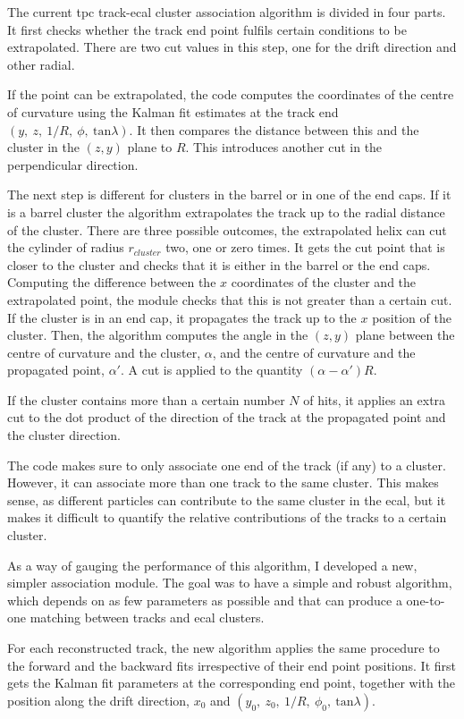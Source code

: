 The current \gls{tpc} track-\gls{ecal} cluster association algorithm is divided in four parts. It first checks whether the track end point fulfils certain conditions to be extrapolated. There are two cut values in this step, one for the drift direction and other radial.

If the point can be extrapolated, the code computes the coordinates of the centre of curvature using the Kalman fit estimates at the track end $(y, \ z, \ 1/R, \ \phi, \ \mathrm{tan}\lambda)$. It then compares the distance between this and the cluster in the $(z,y)$ plane to $R$. This introduces another cut in the perpendicular direction.

The next step is different for clusters in the barrel or in one of the end caps. If it is a barrel cluster the algorithm extrapolates the track up to the radial distance of the cluster. There are three possible outcomes, the extrapolated helix can cut the cylinder of radius $r_{cluster}$ two, one or zero times. It gets the cut point that is closer to the cluster and checks that it is either in the barrel or the end caps. Computing the difference between the $x$ coordinates of the cluster and the extrapolated point, the module checks that this is not greater than a certain cut. If the cluster is in an end cap, it propagates the track up to the $x$ position of the cluster. Then, the algorithm computes the angle in the $(z,y)$ plane between the centre of curvature and the cluster, $\alpha$, and the centre of curvature and the propagated point, $\alpha'$. A cut is applied to the quantity $(\alpha-\alpha')R$.

If the cluster contains more than a certain number $N$ of hits, it applies an extra cut to the dot product of the direction of the track at the propagated point and the cluster direction.

The code makes sure to only associate one end of the track (if any) to a cluster. However, it can associate more than one track to the same cluster. This makes sense, as different particles can contribute to the same cluster in the \gls{ecal}, but it makes it difficult to quantify the relative contributions of the tracks to a certain cluster.

As a way of gauging the performance of this algorithm, I developed a new, simpler association module. The goal was to have a simple and robust algorithm, which depends on as few parameters as possible and that can produce a one-to-one matching between tracks and \gls{ecal} clusters.

For each reconstructed track, the new algorithm applies the same procedure to the forward and the backward fits irrespective of their end point positions. It first gets the Kalman fit parameters at the corresponding end point, together with the position along the drift direction, $x_{0}$ and $(y_{0}, \ z_{0}, \ 1/R, \ \phi_{0}, \ \mathrm{tan}\lambda)$.

